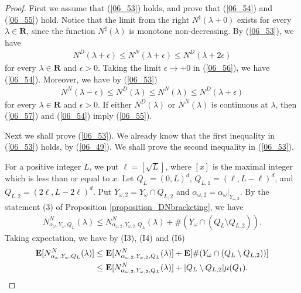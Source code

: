 \documentclass[12pt,a4paper]{article}
\begin{document}
\begin{proof}
First we assume that (\ref{06_53}) holds, and prove
that (\ref{06_54}) and (\ref{06_55}) hold.
Notice that 
the limit from the right
$N^\sharp(\lambda+0)$ exists for every $\lambda\in \mathbf{R}$,
since the function $N^\sharp(\lambda)$ is monotone non-decreasing.
By (\ref{06_53}), we have 
\begin{align}
\label{06_56}
  N^D(\lambda+\epsilon)\leq N^N(\lambda+\epsilon)\leq N^D(\lambda+2\epsilon)
\end{align}
for every $\lambda\in \mathbf{R}$ and $\epsilon>0$.
Taking the limit $\epsilon\to +0$ in (\ref{06_56}), we have
(\ref{06_54}).
Moreover, we have by (\ref{06_53}) 
\begin{align}
\label{06_57}
 N^N(\lambda-\epsilon)\leq N^D(\lambda)\leq N^N(\lambda)\leq N^D(\lambda+\epsilon)
\end{align}
for every $\lambda\in\mathbf{R}$ and $\epsilon>0$.
If either $N^D(\lambda)$ or $N^N(\lambda)$ is continuous at $\lambda$,
then (\ref{06_57}) and (\ref{06_54}) imply (\ref{06_55}).


Next we shall prove (\ref{06_53}).
We already know that the first inequality
in (\ref{06_53}) holds, by (\ref{06_49}).
We shall prove the second inequality in (\ref{06_53}).

For a positive integer $L$,
we put $\ell=[\sqrt{L}]$,
where $[x]$ is the maximal integer which is less than or equal to $x$.
 Let $Q_L=(0,L)^d$, $Q_{L,1}=(\ell,L-\ell)^d$, and 
$Q_{L,2}=(2\ell,L-2\ell)^d$.
Put
 $Y_{\omega,2}=Y_\omega\cap Q_{L,2}$
and
$\alpha_{\omega,2}=\alpha_\omega|_{Y_{\omega,2}}$.
By the statement (3) of Proposition \ref{proposition_DNbracketing},
we have
\begin{align*}
 N^N_{\alpha_\omega,Y_\omega,Q_L}(\lambda)
\leq 
 N^N_{\alpha_{\omega,2},Y_{\omega,2},Q_L}(\lambda)
+
\#(Y_\omega\cap(Q_L\setminus Q_{L,2})).
\end{align*}
Taking expectation, we have by (I3), (I4) and (I6)
\begin{align}
\mathbf{E}[ N^N_{\alpha_\omega,Y_\omega,Q_L}(\lambda)]
\leq &\ 
\mathbf{E}[ N^N_{\alpha_{\omega,2},Y_{\omega,2},Q_L}(\lambda)]
+
\mathbf{E}[\#(Y_\omega\cap(Q_L\setminus Q_{L,2}))]\notag\\
\leq&\ 
\mathbf{E}[ N^N_{\alpha_{\omega,2},Y_{\omega,2},Q_L}(\lambda)]
+|Q_L\setminus Q_{L,2}|\mu(Q_1).
\label{06_58}
\end{align}




\end{proof}
\end{document}
